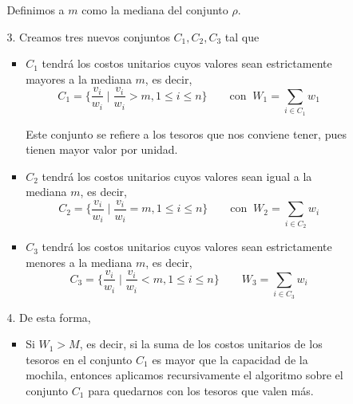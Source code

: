 \documentclass[letterpaper,11pt]{article}
\begin{document}
\begin{enumerate}
\begin{itemize}
\begin{itemize}
            Definimos a $m$ como la mediana del conjunto $\rho$.
            
            \item[3.] Creamos tres nuevos conjuntos $C_1, C_2, C_3$ tal que 
            \begin{itemize}
                \item $C_1$ tendrá los costos unitarios cuyos valores sean 
                estrictamente mayores a la mediana $m$, es decir, 
                \begin{equation*}
                    C_1 = \{\frac{v_i}{w_i} \; | \; \frac{v_i}{w_i} > m, 
                    1 \leq i \leq n\}
                    \quad \quad \text{con} \; \; 
                    W_1 = \sum_{i \in C_1} w_1
                \end{equation*}

                Este conjunto se refiere a los tesoros que nos conviene tener, 
                pues tienen mayor valor por unidad.

                \item $C_2$ tendrá los costos unitarios cuyos valores sean 
                igual a la mediana $m$, es decir, 
                \begin{equation*}
                    C_2 = \{\frac{v_i}{w_i} \; | \; \frac{v_i}{w_i} = m, 
                    1 \leq i \leq n\}
                    \quad \quad \text{con} \; \; 
                    W_2 = \sum_{i \in C_2} w_i
                \end{equation*}

                \item $C_3$ tendrá los costos unitarios cuyos valores sean 
                estrictamente menores a la mediana $m$, es decir, 
                \begin{equation*}
                    C_3 = \{\frac{v_i}{w_i} \; | \; \frac{v_i}{w_i} < m, 
                    1 \leq i \leq n\}
                    \quad \quad 
                    W_3 = \sum_{i \in C_3} w_i
                \end{equation*}
            \end{itemize}

            \item[4.] De esta forma, 
            \begin{itemize}
                \item Si $W_1 > M$, es decir, si la suma de los costos 
                unitarios de los tesoros en el conjunto $C_1$ es mayor que la 
                capacidad de la mochila, entonces aplicamos recursivamente 
                el algoritmo sobre el conjunto $C_1$ para quedarnos con los 
                tesoros que valen más.
                

\end{itemize}
\end{itemize}
\end{itemize}
\end{enumerate}
\end{document}
